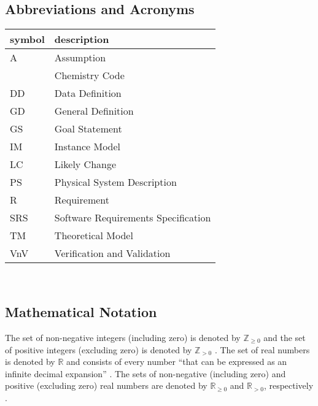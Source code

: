 \documentclass[12pt]{article}
\newcommand*{\nonnegInt}{\mathbb{Z}_{\geq 0}}
\newcommand*{\posInt}{\mathbb{Z}_{> 0}}
\newcommand*{\nonnegReal}{\mathbb{R}_{\geq 0}}
\newcommand*{\posReal}{\mathbb{R}_{> 0}}
\begin{document}
\subsection{Abbreviations and Acronyms} \label{srs_sec_abbsAcrs}

\renewcommand{\arraystretch}{1.2}
\begin{tabular}{l l}
  \toprule
  \textbf{symbol} & \textbf{description}                \\
  \midrule
  A               & Assumption                          \\
  \progname{}     & Chemistry Code                      \\
  DD              & Data Definition                     \\
  GD              & General Definition                  \\
  GS              & Goal Statement                      \\
  IM              & Instance Model                      \\
  LC              & Likely Change                       \\
  PS              & Physical System Description         \\
  R               & Requirement                         \\
  SRS             & Software Requirements Specification \\
  TM              & Theoretical Model                   \\
  VnV             & Verification and Validation         \\
  \bottomrule
\end{tabular}\\

\subsection{Mathematical Notation} \label{sec_mathNot}

The set of non-negative integers (including zero) is denoted by $\nonnegInt$
and the set of positive integers (excluding zero) is denoted by $\posInt$
\cite{wikipedia_natural_2023}. The
set of real numbers is denoted by $\mathbb{R}$ and consists of every number
``that can be expressed as an infinite decimal expansion''
\cite{the_editors_of_encyclopaedia_britannica_real_2022}. The sets of
non-negative (including zero) and positive (excluding zero) real numbers are
denoted by $\nonnegReal$ and $\posReal$, respectively
\cite{wikipedia_positive_2023}.
\end{document}

